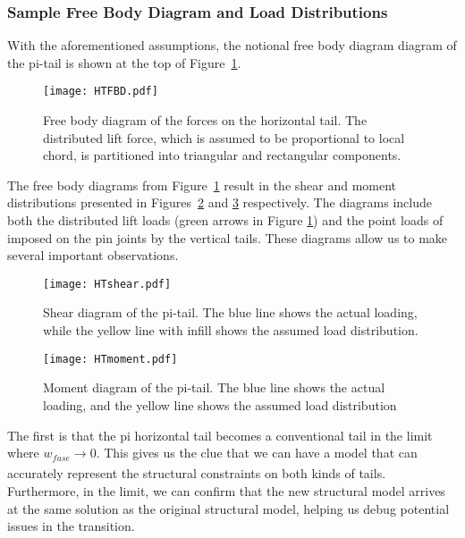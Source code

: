 \subsubsection{Sample Free Body Diagram and Load Distributions}
\label{s:loadDistributions}

With the aforementioned assumptions, the notional free body diagram diagram of the
pi-tail is shown at the top of Figure~\ref{f:HTFBD}.

\begin{figure}[!ht]
\centering
\texttt{[image: HTFBD.pdf]}
\caption{Free body diagram of the forces on the horizontal tail. The distributed 
lift force, which is assumed to be proportional to local chord, is partitioned 
into triangular and rectangular components.}
\label{f:HTFBD}
\end{figure}

The free body diagrams from Figure~\ref{f:HTFBD} result in the
shear and moment distributions presented in Figures~\ref{f:HTshear} and
\ref{f:HTmoment} respectively. The diagrams include both the distributed lift
loads (green arrows in Figure \ref{f:HTFBD}) and the point loads of imposed on
the pin joints by the vertical tails. These diagrams allow
us to make several important observations.


\begin{figure}[!ht]
    \centering
    \texttt{[image: HTshear.pdf]}
    \caption{Shear diagram of the pi-tail. The blue line shows the actual 
loading, while the yellow line with infill shows the assumed load distribution.}
    \label{f:HTshear}
\end{figure}

\begin{figure}[!ht]
    \centering
    \texttt{[image: HTmoment.pdf]}
    \caption{Moment diagram of the pi-tail. The blue line shows the actual 
loading, and the yellow line shows the assumed load distribution}
    \label{f:HTmoment}
\end{figure}

The first is that the pi horizontal tail becomes a conventional tail in
the limit where $w_{fuse} \xrightarrow[]{} 0$. This gives us the clue that we can
have a model that can accurately represent the structural constraints on both kinds
of tails. Furthermore, in the limit, we can confirm that the new structural model
arrives at the same solution as the original structural model, helping us debug
potential issues in the transition.


